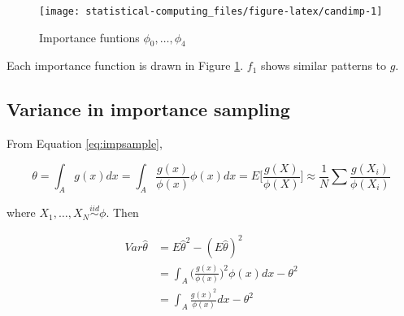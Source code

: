 \documentclass[]{book}
\newenvironment{Shaded}{\begin{snugshade}}{\end{snugshade}}
\newcommand{\DataTypeTok}[1]{\textcolor[rgb]{0.13,0.29,0.53}{#1}}
\newcommand{\DecValTok}[1]{\textcolor[rgb]{0.00,0.00,0.81}{#1}}
\newcommand{\FloatTok}[1]{\textcolor[rgb]{0.00,0.00,0.81}{#1}}
\newcommand{\KeywordTok}[1]{\textcolor[rgb]{0.13,0.29,0.53}{\textbf{#1}}}
\newcommand{\NormalTok}[1]{#1}
\newcommand{\OperatorTok}[1]{\textcolor[rgb]{0.81,0.36,0.00}{\textbf{#1}}}
\newcommand{\StringTok}[1]{\textcolor[rgb]{0.31,0.60,0.02}{#1}}
\theoremstyle{definition}
\theoremstyle{definition}
\theoremstyle{definition}
\theoremstyle{remark}
\begin{document}
\begin{Shaded}
\end{Shaded}

\begin{figure}[H]

{\centering \texttt{[image: statistical-computing\_files/figure-latex/candimp-1]} 

}

\caption{Importance funtions $\phi_0, \ldots, \phi_4$}\label{fig:candimp}
\end{figure}

Each importance function is drawn in Figure \ref{fig:candimp}. \(f_1\) shows similar patterns to \(g\).

\hypertarget{variance-in-importance-sampling}{%
\subsection{Variance in importance sampling}\label{variance-in-importance-sampling}}

From Equation \eqref{eq:impsample},

\[\theta = \int_A g(x)dx = \int_A \frac{g(x)}{\phi(x)}\phi(x) dx = E\bigg[ \frac{g(X)}{\phi(X)} \bigg] \approx \frac{1}{N} \sum \frac{g(X_i)}{\phi(X_i)}\]

where \(X_1, \ldots, X_N \stackrel{iid}{\sim}\phi\). Then

\begin{equation*}
  \begin{split}
    Var\hat\theta & = E\hat\theta^2 - (E\hat\theta)^2 \\
    & = \int_A \bigg(\frac{g(x)}{\phi(x)}\bigg)^2 \phi(x) dx - \theta^2 \\
    & = \int_A \frac{g(x)^2}{\phi(x)} dx - \theta^2
  \end{split}
\end{equation*}
\end{document}
